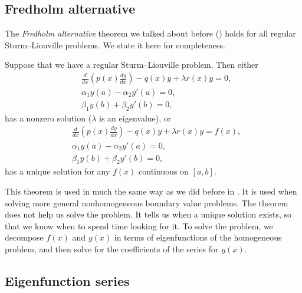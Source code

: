 \subsection{Fredholm alternative}

The \emph{Fredholm alternative} theorem we talked about before
()
holds for all regular Sturm--Liouville problems.
We state it here for completeness.

\begin{theorem}%
Suppose that we have a regular Sturm--Liouville problem.
Then either
\begin{align*}
&\frac{d}{dx} \left( p(x) \frac{dy}{dx} \right)
- q(x) y + \lambda r(x) y = 0 , \\
&\alpha_1 y(a) - \alpha_2 y'(a) = 0 , \\
&\beta_1 y(b) + \beta_2 y'(b) = 0 ,
\end{align*}
has a nonzero solution ($\lambda$ is an eigenvalue), or
\begin{align*}
&\frac{d}{dx} \left( p(x) \frac{dy}{dx} \right)
- q(x) y + \lambda r(x) y = f(x) , \\
&\alpha_1 y(a) - \alpha_2 y'(a) = 0 , \\
&\beta_1 y(b) + \beta_2 y'(b) = 0 ,
\end{align*}
has a unique solution for any $f(x)$ continuous on $[a,b]$.
\end{theorem}

This theorem is used in much the same way as we did before in
.  It is used when solving more general nonhomogeneous
boundary value problems.  The theorem does not help us solve the problem.
It tells us when a unique solution exists, so
that we know when to spend time looking for it.  To solve the problem,
we decompose $f(x)$ and $y(x)$ in terms of eigenfunctions of the
homogeneous
problem, and then solve for the coefficients of the series for $y(x)$.

\subsection{Eigenfunction series}

